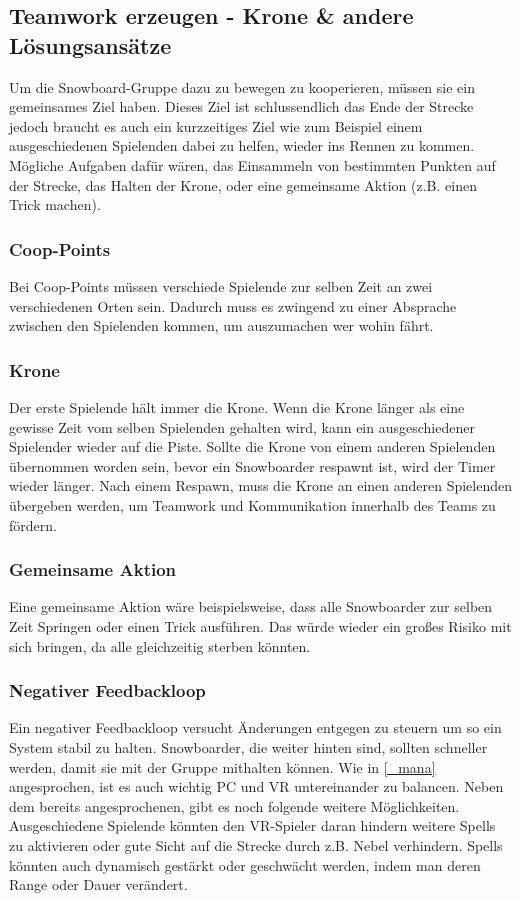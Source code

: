 \subsection{Teamwork erzeugen - Krone \& andere Lösungsansätze\label{_teamwork_erzeugen}}
Um die Snowboard-Gruppe dazu zu bewegen zu kooperieren, müssen sie ein gemeinsames Ziel haben. Dieses Ziel ist schlussendlich das Ende der Strecke jedoch braucht es auch ein kurzzeitiges Ziel wie zum Beispiel einem ausgeschiedenen Spielenden dabei zu helfen, wieder ins Rennen zu kommen. Mögliche Aufgaben dafür wären, das Einsammeln von bestimmten Punkten auf der Strecke, das Halten der Krone, oder eine gemeinsame Aktion (z.B. einen Trick machen).

\subsubsection{Coop-Points}
Bei Coop-Points müssen verschiede Spielende zur selben Zeit an zwei verschiedenen Orten sein. Dadurch muss es zwingend zu einer Absprache zwischen den Spielenden kommen, um auszumachen wer wohin fährt.

\subsubsection{Krone\label{_krone}}
Der erste Spielende hält immer die Krone. Wenn die Krone länger als eine gewisse Zeit vom selben Spielenden gehalten wird, kann ein ausgeschiedener Spielender wieder auf die Piste. Sollte die Krone von einem anderen Spielenden übernommen worden sein, bevor ein Snowboarder respawnt ist, wird der Timer wieder länger. Nach einem Respawn, muss die Krone an einen anderen Spielenden übergeben werden, um Teamwork und Kommunikation innerhalb des Teams zu fördern.

\subsubsection{Gemeinsame Aktion}
Eine gemeinsame Aktion wäre beispielsweise, dass alle Snowboarder zur selben Zeit Springen oder einen Trick ausführen. Das würde wieder ein großes Risiko mit sich bringen, da alle gleichzeitig sterben könnten.

\subsubsection{Negativer Feedbackloop\label{_rubberbanding}}
Ein negativer Feedbackloop versucht Änderungen entgegen zu steuern um so ein System stabil zu halten\cite[S.133]{_game_design_workshop}. Snowboarder, die weiter hinten sind, sollten schneller werden, damit sie mit der Gruppe mithalten können. Wie in \ref{_mana} angesprochen, ist es auch wichtig PC und VR untereinander zu balancen. Neben dem bereits angesprochenen, gibt es noch folgende weitere Möglichkeiten. Ausgeschiedene Spielende könnten den VR-Spieler daran hindern weitere Spells zu aktivieren oder gute Sicht auf die Strecke durch z.B. Nebel verhindern. Spells könnten auch dynamisch gestärkt oder geschwächt werden, indem man deren Range oder Dauer verändert.